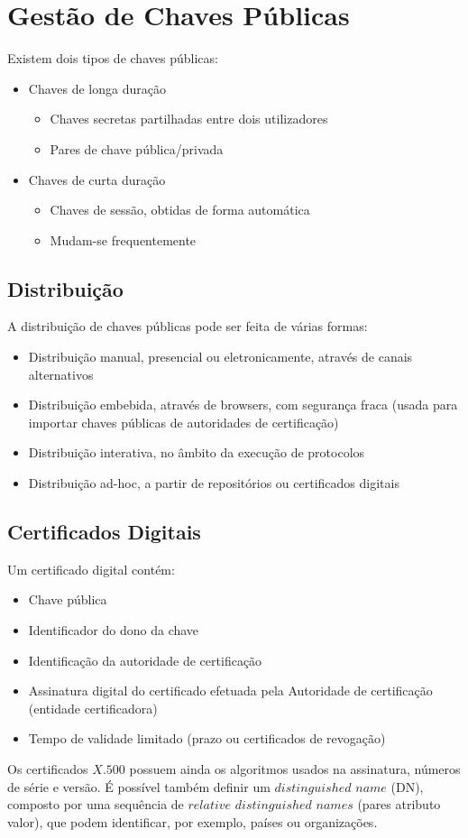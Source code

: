 \documentclass[10pt,a4paper]{report}
\begin{document}
\section{Gestão de Chaves Públicas}
Existem dois tipos de chaves públicas:
\begin{itemize}
\item Chaves de longa duração
\begin{itemize}
\item Chaves secretas partilhadas entre dois utilizadores
\item Pares de chave pública/privada
\end{itemize}
\item Chaves de curta duração
\begin{itemize}
\item Chaves de sessão, obtidas de forma automática
\item Mudam-se frequentemente
\end{itemize}
\end{itemize}
\subsection{Distribuição}
A distribuição de chaves públicas pode ser feita de várias formas:
\begin{itemize}
\item Distribuição manual, presencial ou eletronicamente, através de canais alternativos
\item Distribuição embebida, através de browsers, com segurança fraca (usada para importar chaves públicas de autoridades de certificação)
\item Distribuição interativa, no âmbito da execução de protocolos
\item Distribuição ad-hoc, a partir de repositórios ou certificados digitais
\end{itemize}
\subsection{Certificados Digitais}
Um certificado digital contém:
\begin{itemize}
\item Chave pública
\item Identificador do dono da chave
\item Identificação da autoridade de certificação
\item Assinatura digital do certificado efetuada pela Autoridade de certificação (entidade certificadora)
\item Tempo de validade limitado (prazo ou certificados de revogação)
\end{itemize}
Os certificados $X.500$ possuem ainda os algoritmos usados na assinatura, números de série e versão. É possível também definir um $distinguished$ $name$ (DN), composto por uma sequência de $relative$ $distinguished$ $names$ (pares atributo valor), que podem identificar, por exemplo, países ou organizações.
\end{document}
